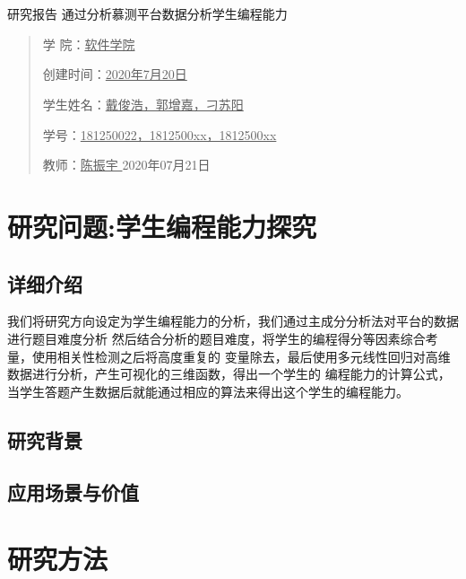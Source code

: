 \documentclass[UTF8]{ctexart}
\date{}
\begin{document}
\ttfamily \songti
{}

\begin{center}
    \quad \\
    \quad \\
    \heiti \fontsize{45}{17} 研\quad 究\quad 报\quad 告
    \vskip 3.5cm
    \heiti {} 通过分析慕测平台数据分析学生编程能力	
\end{center}
\vskip 3.5cm

\begin{quotation}
    \songti \fontsize{15}{15}
    \doublespacing
    \par\setlength\parindent{12em}
    \quad 

    学\hspace{0.61cm} 院：\underline{\quad 软件学院\quad}

    创建时间：\underline{2020年7月20日}

    学生姓名：\underline{戴俊浩，郭增嘉，刁苏阳}

    学\hspace{0.61cm}号：\underline{\small 181250022，1812500xx，1812500xx}

    教\hspace{0.61cm}师：\underline{\qquad 陈振宇 \qquad}
    \vskip 2cm
    \centering
    2020年07月21日
\end{quotation}

\newpage
\tableofcontents
\newpage
\section{研究问题:学生编程能力探究}
\subsection{详细介绍}
我们将研究方向设定为学生编程能力的分析，我们通过主成分分析法对平台的数据进行题目难度分析
然后结合分析的题目难度，将学生的编程得分等因素综合考量，使用相关性检测之后将高度重复的
变量除去，最后使用多元线性回归对高维数据进行分析，产生可视化的三维函数，得出一个学生的
编程能力的计算公式，当学生答题产生数据后就能通过相应的算法来得出这个学生的编程能力。
\subsection{研究背景}
\subsection{应用场景与价值}
\section{研究方法}
\end{document}
